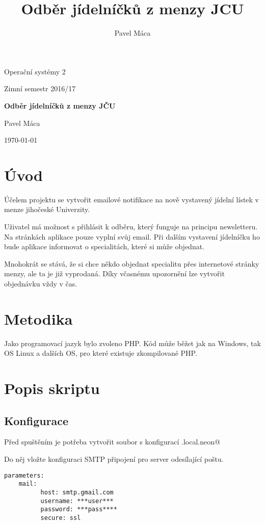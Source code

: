\documentclass[a4]{article}
\title{Odběr jídelníčků z menzy JCU}
\author{Pavel Máca}
\begin{document}
\begin{titlepage}
	\centering
	{\Huge Operační systémy 2\par}
	\vspace{1cm}
	{\Large Zimní semestr 2016/17\par}
	\vspace{1.5cm}
	{\huge\bfseries Odběr jídelníčků z menzy JČU\par}
	\vspace{2cm}
	{\Large Pavel Máca\par}
	\vfill


	{\large \today\par}
\end{titlepage}

\pagebreak

\section{Úvod}
Účelem projektu se vytvořit emailové notifikace na nově vystavený jídelní lístek v menze jihočeské Univerzity.

Uživatel má možnost s přihlásit k odběru, který funguje na principu newsletteru. Na stránkách aplikace pouze vyplní svůj email. Při dalším vystavení jídelníčku ho bude aplikace informovat o specialitách, které si může objednat.

Mnohokrát se stává, že si chce někdo objednat specialitu přes internetové stránky menzy, ale ta je již vyprodaná. Díky včasnému upozornění lze vytvořit objednávku vždy v čas.


\section{Metodika}
Jako programovací jazyk bylo zvoleno PHP. Kód může běžet jak na Windows, tak OS Linux  a dalších OS, pro které existuje zkompilované PHP.

\section{Popis skriptu}
\subsection{Konfigurace}
Před spuštěním je potřeba vytvořit soubor s konfigurací
\verb@config.local.neon@

Do něj vložte konfiguraci SMTP připojení pro server odesílající poštu.
\begin{lstlisting}
parameters:
    mail:
          host: smtp.gmail.com
          username: ***user***
          password: ***pass****
          secure: ssl
\end{lstlisting}
\end{document}
